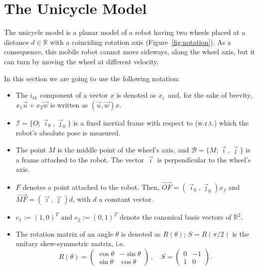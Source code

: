\section{The Unicycle Model}
The unicycle model is a planar model of a robot having two wheels placed at a distance $d \in \mathbb{R}$ with a coinciding rotation axis (Figure~\ref{fig:notation}).  As a consequence, this mobile robot cannot move sideways, along the wheel axis, but it can turn by moving the wheel at different velocity. 

In this section we are going to use the following notation:
\begin{itemize}
	\item The $i_{th}$ component of a vector $x$ is denoted as $x_i$~and, for the sake of brevity, 
	$x_1 \vec{u} {+} x_2 \vec{w}$ is written as $(\vec{u},\vec{w})x$.
	
	\item $\mathcal{I} = \{O;\vec{\imath}_0,\vec{\jmath}_0\}$ is a fixed inertial frame with respect to (w.r.t.) 
	which the robot's absolute pose is measured.
	\item The point $M$ is the middle point of the wheel's axis, and $\mathcal{B} = \{M; \vec{\imath}, \vec{\jmath}\}$ is a frame attached to the robot.
	The vector $\vec{\imath}$ is perpendicular to the  wheel's axis.  
	\item $F$ denotes a point attached to the robot. Then, $\vec{OF} = (\vec{\imath}_0,\vec{\jmath}_0) x_f $ and 
	$\vec{MF} =  (\vec{\imath},\vec{\jmath}) d$, with $d$ a constant vector.
	\item $e_1 := (1,0)^T$ and $e_2 :=(0,1)^T$ denote the canonical basis vectors of $\mathbb{R}^2$.
	\item The rotation matrix of an angle $\theta$ is denoted as $R(\theta)$; $S=R(\pi/2)$ is the unitary skew-symmetric matrix, i.e.
	\[
	R(\theta)= \begin{pmatrix}
	\cos \theta & - \sin \theta \\
	\sin \theta & \cos \theta
	\end{pmatrix} \, , \quad 
	S =  \begin{pmatrix}
	0 & -1 \\
	1 & 0
	\end{pmatrix}.
	\]
\end{itemize}

